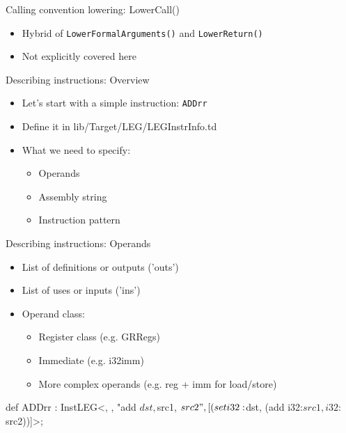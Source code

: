 \begin{frame}{Calling convention lowering: LowerCall()}

\begin{itemize}
    \item Hybrid of \texttt{LowerFormalArguments()} and \texttt{LowerReturn()}
    \item Not explicitly covered here
\end{itemize}

\end{frame}


\begin{frame}{Describing instructions: Overview}

\begin{itemize}
    \item Let's start with a simple instruction: \texttt{ADDrr}
    \item Define it in lib/Target/LEG/LEGInstrInfo.td
    \item What we need to specify:
    \begin{itemize}
        \item Operands
        \item Assembly string
        \item Instruction pattern
    \end{itemize}
\end{itemize}

\end{frame}


\begin{frame}[fragile]{Describing instructions: Operands}

\begin{itemize}
    \item List of definitions or outputs ('outs')
    \item List of uses or inputs ('ins')
    \item Operand class:
    \begin{itemize}
        \item Register class (e.g. GRRegs)
        \item Immediate (e.g. i32imm)
        \item More complex operands (e.g. reg + imm for load/store)
    \end{itemize}
\end{itemize}

\begin{codebox}[commandchars=\\\{\}]
def ADDrr : InstLEG<,
                    ,
                    "add $dst, $src1, $src2",
                    [(set i32:$dst, (add i32:$src1, i32:$src2))]>;
\end{codebox}

\end{frame}

